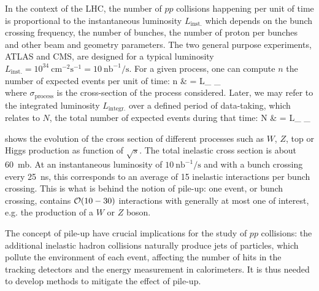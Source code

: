     In the context of the LHC, the number of $pp$ collisions happening per unit of time is
    proportional to the instantaneous luminosity $L_\text{inst.}$ which depends on the bunch crossing
    frequency, the number of bunches, the number of proton per bunches and other beam and
    geometry parameters.  The two general purpose experiments, ATLAS and CMS, are designed
    for a typical luminosity $L_\text{inst.} = 10^{34}~\text{cm}^{-2}
    \text{s}^{-1} = 10~\text{nb}^{-1} / \text{s}$. For a given process, one can compute $n$
    the number of expected events per unit of time:
    {
        n & = L_ \times \sigma_ \\
    }
    where $\sigma_\text{process}$ is the cross-section of the process considered. Later, we may refer
    to the integrated luminosity $L_\text{integr.}$ over a defined period of data-taking,
    which relates to $N$, the total number of expected events during that time:
    {
        N & = L_ \times \sigma_
    }

     shows the evolution of the cross section of different
    processes such as $W$, $Z$, top or Higgs production as function of $\sqrt{s}$. The
    total inelastic cross section is about 60~mb. At an instantaneous luminosity of
    $10~\text{nb}^{-1} / \text{s}$ and with a bunch crossing every 25~ns, this corresponds
    to an average of 15 inelastic interactions per bunch crossing. This is what is behind
    the notion of pile-up: one event, or bunch crossing, contains $\mathcal{O}(10-30)$ interactions
    with generally at most one of interest, e.g. the production of a $W$ or $Z$ boson.


    The concept of pile-up have crucial implications for the study of $pp$ collisions: the
    additional inelastic hadron collisions naturally produce jets of particles, which
    pollute the environment of each event, affecting the number of hits in the tracking
    detectors and the energy measurement in calorimeters. It is thus needed to develop
    methods to mitigate the effect of pile-up.

